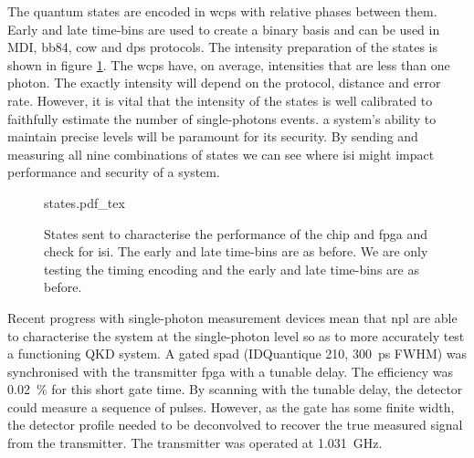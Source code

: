 The quantum states are encoded in \acp{wcp} with relative phases between them. Early and late time-bins are used to create a binary basis and can be used in \ac{MDI}, \ac{bb84}, \ac{cow} and \ac{dps} protocols. The intensity preparation of the states is shown in figure \ref{fig:isi_states}. The \acp{wcp} have, on average, intensities that are less than one photon. The exactly intensity will depend on the protocol, distance and error rate. However, it is vital that the intensity of the states is well calibrated to faithfully estimate the number of single-photons events. a system's ability to maintain precise levels will be paramount for its security. By sending and measuring all nine combinations of states we can see where \ac{isi} might impact performance and security of a system.

\begin{figure}[t]
	\centering
	\def\svgwidth{0.9\textwidth} 
	{states.pdf_tex}
	\caption[States sent for ISI calibration]{States sent to characterise the performance of the chip and \ac{fpga} and check for \ac{isi}. The early and late time-bins are as before. We are only testing the timing encoding and the early and late time-bins are as before.}
	\label{fig:isi_states}
\end{figure}

Recent progress with single-photon measurement devices mean that \ac{npl} are able to characterise the system at the single-photon level so as to more accurately test a functioning \ac{QKD} system. A gated \ac{spad} (IDQuantique 210, \SI{300}{ps} \ac{FWHM}) was synchronised with the transmitter \ac{fpga} with a tunable delay. The efficiency was \SI{0.02}{\percent} for this short gate time. By scanning with the tunable delay, the detector could measure a sequence of pulses. However, as the gate has some finite width, the detector profile needed to be deconvolved to recover the true measured signal from the transmitter. The transmitter was operated at \SI{1.031}{GHz}. 





